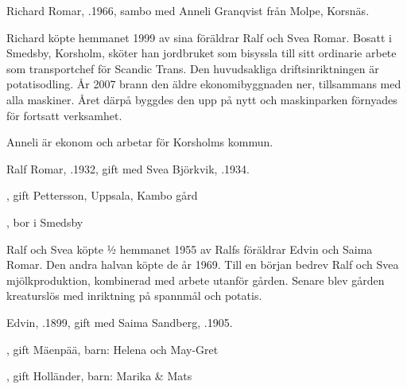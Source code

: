 %


%
Richard Romar, .1966, sambo med Anneli Granqvist från Molpe, Korsnäs.
\begin{jhchildren}
  \item {}
  \item {}
  \item {}
\end{jhchildren}
Richard köpte hemmanet 1999 av sina föräldrar Ralf och Svea Romar. Bosatt i Smedsby, Korsholm, sköter han jordbruket som bisyssla till sitt ordinarie arbete som transportchef för Scandic Trans. Den huvudsakliga driftsinriktningen är potatisodling. År 2007 brann den äldre ekonomibyggnaden ner, tillsammans med alla maskiner. Året därpå byggdes den upp på nytt och maskinparken förnyades för fortsatt verksamhet.

Anneli är ekonom och arbetar för Korsholms kommun.



%
Ralf Romar, .1932, gift med Svea Björkvik, .1934.
\begin{jhchildren}
  \item {}, gift Pettersson, Uppsala, Kambo gård
  \item {}, bor i Smedsby
\end{jhchildren}
Ralf och Svea köpte ½ hemmanet 1955 av Ralfs föräldrar Edvin och Saima Romar. Den andra halvan köpte de  år 1969. Till en början bedrev Ralf och Svea mjölkproduktion, kombinerad med arbete utanför gården. Senare blev gården kreaturslös med inriktning på spannmål och potatis.


%
Edvin, .1899, gift med Saima Sandberg, .1905.
\begin{jhchildren}
  \item {}, gift Mäenpää, barn: Helena och May-Gret
  \item {}
  \item {}, gift Holländer, barn: Marika \& Mats
\end{jhchildren}


